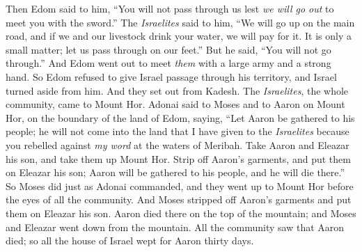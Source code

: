 \begin{biblechapter}
\verse Then Edom said to him, “You will not pass through us lest \textit{we will go out} to meet you with the sword.”
\verse The \textit{Israelites} said to him, “We will go up on the main road, and if we and our livestock drink your water, we will pay for it. It is only a small matter; let us pass through on our feet.”
\verse But he said, “You will not go through.” And Edom went out to meet \textit{them} with a large army and a strong hand.
\verse So Edom refused to give Israel passage through his territory, and Israel turned aside from him.
 And they set out from Kadesh. The \textit{Israelites}, the whole community, came to Mount Hor.
\verse Adonai said to Moses and to Aaron on Mount Hor, on the boundary of the land of Edom, saying,
\verse “Let Aaron be gathered to his people; he will not come into the land that I have given to the \textit{Israelites} because you rebelled against \textit{my word} at the waters of Meribah.
\verse Take Aaron and Eleazar his son, and take them up Mount Hor.
\verse Strip off Aaron’s garments, and put them on Eleazar his son; Aaron will be gathered to his people, and he will die there.”
\verse So Moses did just as Adonai commanded, and they went up to Mount Hor before the eyes of all the community.
\verse And Moses stripped off Aaron’s garments and put them on Eleazar his son. Aaron died there on the top of the mountain; and Moses and Eleazar went down from the mountain.
\verse All the community saw that Aaron died; so all the house of Israel wept for Aaron thirty days.
\end{biblechapter}

